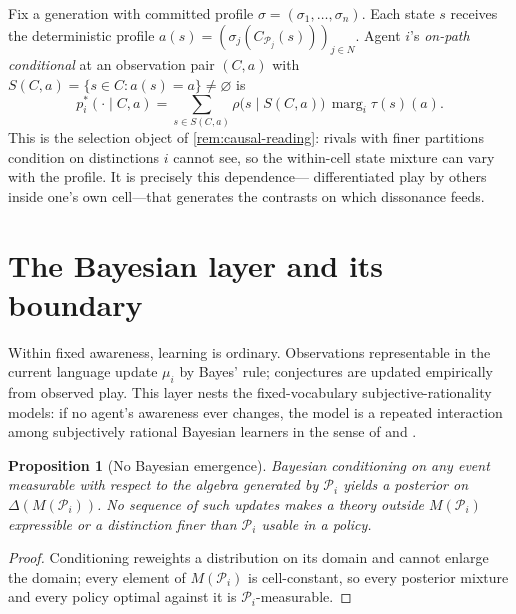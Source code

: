 \documentclass[11pt]{article}
\newtheorem{proposition}[assumption]{Proposition}
\newcommand{\emptysetset}{\varnothing}
\newcommand{\marg}[1]{\operatorname{marg}_{#1}}
\begin{document}
Fix a generation with committed profile $\sigma=(\sigma_1,\dots,\sigma_n)$.
Each state $s$ receives the deterministic profile
$a(s)=(\sigma_j(C_{\mathcal P_j}(s)))_{j\in N}$.  Agent $i$'s \emph{on-path
conditional} at an observation pair $(C,a)$ with
$S(C,a)=\{s\in C:a(s)=a\}\neq\emptysetset$ is
\begin{equation}
p_i^{*}(\cdot\mid C,a)
=
\sum_{s\in S(C,a)}\rho\bigl(s\mid S(C,a)\bigr)\,\marg{i}\tau(s)(a).
\label{eq:onpath-conditional}
\end{equation}
This is the selection object of \cref{rem:causal-reading}: rivals with finer
partitions condition on distinctions $i$ cannot see, so the within-cell state
mixture can vary with the profile.  It is precisely this dependence---
differentiated play by others inside one's own cell---that generates the
contrasts on which dissonance feeds.

\section{The Bayesian layer and its boundary}
\label{sec:bayesian-layer}

Within fixed awareness, learning is ordinary.  Observations representable in
the current language update $\mu_i$ by Bayes' rule; conjectures are updated
empirically from observed play.  This layer nests the fixed-vocabulary
subjective-rationality models: if no agent's awareness ever changes, the model
is a repeated interaction among subjectively rational Bayesian learners in the
sense of \citet{KalaiLehrer1993b} and \citet{Ryall2003}.

\begin{proposition}[No Bayesian emergence]
\label{prop:no-emergence}
Bayesian conditioning on any event measurable with respect to the algebra
generated by $\mathcal P_i$ yields a posterior on $\Delta(M(\mathcal P_i))$.
No sequence of such updates makes a theory outside $M(\mathcal P_i)$
expressible or a distinction finer than $\mathcal P_i$ usable in a policy.
\end{proposition}

\begin{proof}
Conditioning reweights a distribution on its domain and cannot enlarge the
domain; every element of $M(\mathcal P_i)$ is cell-constant, so every
posterior mixture and every policy optimal against it is
$\mathcal P_i$-measurable.
\end{proof}
\end{document}
